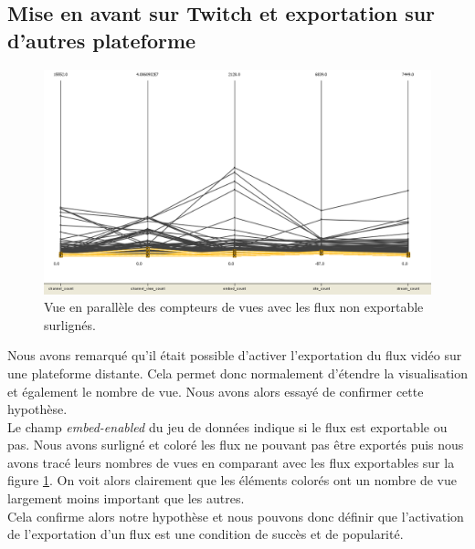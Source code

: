 \documentclass[11pt, a4paper, titlepage]{scrartcl}
\begin{document}
\subsection{Mise en avant sur Twitch et exportation sur d'autres plateforme}
\begin{figure}[h]
    \centering
    \includegraphics[width=\textwidth]{images/embed_enabled_influence}
    \caption{\label{fig:embed_enabled_influence} Vue en parallèle des compteurs
        de vues avec les flux non exportable surlignés.}
\end{figure}

Nous avons remarqué qu'il était possible d'activer l'exportation du flux vidéo
sur une plateforme distante. Cela permet donc normalement d'étendre la
visualisation et également le nombre de vue. Nous avons alors essayé de
confirmer cette hypothèse. \\

Le champ \textit{embed-enabled} du jeu de données indique si le flux est
exportable ou pas. Nous avons surligné et coloré les flux ne pouvant pas être
exportés puis nous avons tracé leurs nombres de vues en comparant avec les flux
exportables sur la figure \ref{fig:embed_enabled_influence}. On voit alors
clairement que les éléments colorés ont un nombre de vue largement moins
important que les autres. \\

Cela confirme alors notre hypothèse et nous pouvons donc définir que
l'activation de l'exportation d'un flux est une condition de succès et de
popularité. \\
\end{document}
